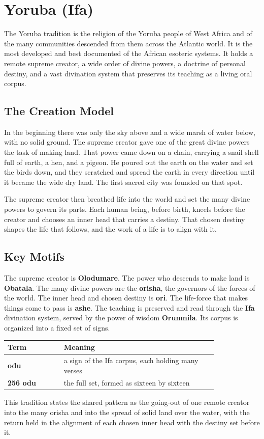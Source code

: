 \section{Yoruba (Ifa)}

The Yoruba tradition is the religion of the Yoruba people of West Africa and of the many communities descended from them across the Atlantic world. It is the most developed and best documented of the African esoteric systems. It holds a remote supreme creator, a wide order of divine powers, a doctrine of personal destiny, and a vast divination system that preserves its teaching as a living oral corpus.

\subsection{The Creation Model}

In the beginning there was only the sky above and a wide marsh of water below, with no solid ground. The supreme creator gave one of the great divine powers the task of making land. That power came down on a chain, carrying a snail shell full of earth, a hen, and a pigeon. He poured out the earth on the water and set the birds down, and they scratched and spread the earth in every direction until it became the wide dry land. The first sacred city was founded on that spot.

The supreme creator then breathed life into the world and set the many divine powers to govern its parts. Each human being, before birth, kneels before the creator and chooses an inner head that carries a destiny. That chosen destiny shapes the life that follows, and the work of a life is to align with it.

\subsection{Key Motifs}

The supreme creator is \textbf{Olodumare}. The power who descends to make land is \textbf{Obatala}. The many divine powers are the \textbf{orisha}, the governors of the forces of the world. The inner head and chosen destiny is \textbf{ori}. The life-force that makes things come to pass is \textbf{ashe}. The teaching is preserved and read through the \textbf{Ifa} divination system, served by the power of wisdom \textbf{Orunmila}. Its corpus is organized into a fixed set of signs.

\begin{longtable}{L{0.22\linewidth}
L{0.6\linewidth}}
\toprule
\textbf{Term} & \textbf{Meaning} \\
\midrule
\textbf{odu} & a sign of the Ifa corpus, each holding many verses \\
\textbf{256 odu} & the full set, formed as sixteen by sixteen \\
\bottomrule
\end{longtable}

This tradition states the shared pattern as the going-out of one remote creator into the many orisha and into the spread of solid land over the water, with the return held in the alignment of each chosen inner head with the destiny set before it.
